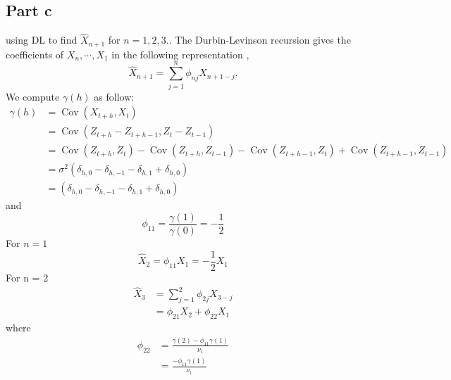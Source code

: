 \documentclass[11pt, oneside]{article}   	%
\newcommand{\Cov}{\operatorname{Cov}}
\begin{document}
\subsection{Part c}
 using DL to find $\widehat{X}_{n+1}$ for $n = 1,2,3.$. The Durbin-Levinson recursion gives the coefficients of $X_{n}, \cdots, X_{1}$ in the following representation \cite{petter},
 \begin{equation}
 \widehat{X}_{n+1} = \sum_{j=1}^{n}\phi_{nj}X_{n+1-j}.
 \end{equation}
 We compute $\gamma(h)$ as follow:
 \begin{equation}
\begin{split}
\gamma(h) &= \Cov(X_{t+h}, X_{t})\\
&= \Cov(Z_{t+h} - Z_{t+h-1}, Z_{t} - Z_{t-1})\\
&=\Cov(Z_{t+h},Z_{t})-\Cov(Z_{t+h},Z_{t-1})-\Cov(Z_{t+h-1},Z_{t})+\Cov(Z_{t+h-1},Z_{t-1})\\
&=\sigma^{2}(\delta_{h,0}-\delta_{h,-1}-\delta_{h,1}+\delta_{h,0})\\
&=(\delta_{h,0}-\delta_{h,-1}-\delta_{h,1}+\delta_{h,0})
\end{split}
 \end{equation}
 and 
 \begin{equation}
 \phi_{11} = \frac{\gamma(1)}{\gamma(0)} = -\frac{1}{2}
 \end{equation}
 For $n=1$
 \begin{equation}
 \widehat{X}_{2} = \phi_{11}X_{1} = -\frac{1}{2}X_{1}
 \end{equation}
 For n = 2
 \begin{equation}
 \begin{split}
 \widehat{X}_{3} &= \sum_{j=1}^{2}\phi_{2j}X_{3-j}\\
 &=\phi_{21}X_{2} + \phi_{22}X_{1}
 \end{split}
 \end{equation}
 where 
 \begin{equation}
 \begin{split}
 \phi_{22} &= \frac{\gamma(2)-\phi_{11}\gamma(1)}{\nu_{1}}\\
 &=\frac{-\phi_{11}\gamma(1)}{\nu_{1}}\\
 \end{split}
 \end{equation}
 
 
 




 
\end{document}
